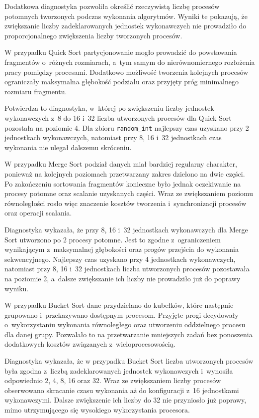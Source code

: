 Dodatkowa diagnostyka pozwoliła określić rzeczywistą liczbę procesów potomnych tworzonych podczas wykonania algorytmów. 
Wyniki te pokazują, że zwiększanie liczby zadeklarowanych jednostek wykonawczych
nie prowadziło do proporcjonalnego zwiększenia liczby tworzonych procesów.

W przypadku Quick Sort partycjonowanie mogło prowadzić do powstawania fragmentów o~różnych rozmiarach, 
a~tym samym do nierównomiernego rozłożenia pracy pomiędzy procesami. 
Dodatkowo możliwość tworzenia kolejnych procesów ograniczały maksymalna głębokość podziału oraz przyjęty próg minimalnego rozmiaru fragmentu.

Potwierdza to diagnostyka, w~której po zwiększeniu liczby jednostek wykonawczych z~8 do 16 i~32 
liczba utworzonych procesów dla Quick Sort pozostała na poziomie 4. 
Dla zbioru \texttt{random\_int} najlepszy czas uzyskano przy 2 jednostkach wykonawczych,
natomiast przy 8, 16 i~32 jednostkach czas wykonania nie ulegał dalszemu skróceniu.

W przypadku Merge Sort podział danych miał bardziej regularny charakter, ponieważ na kolejnych 
poziomach przetwarzany zakres dzielono na dwie części. 
Po zakończeniu sortowania fragmentów konieczne było jednak oczekiwanie na procesy potomne oraz scalanie uzyskanych części. 
Wraz ze zwiększaniem poziomu równoległości rosło więc znaczenie kosztów tworzenia i~synchronizacji procesów oraz operacji scalania.

Diagnostyka wykazała, że przy 8, 16 i~32 jednostkach wykonawczych dla Merge Sort utworzono po 2 procesy potomne. 
Jest to zgodne z~ograniczeniem wynikającym z~maksymalnej głębokości oraz progów przejścia do wykonania sekwencyjnego. 
Najlepszy czas uzyskano przy 4 jednostkach wykonawczych,
natomiast przy 8, 16 i~32 jednostkach liczba utworzonych procesów pozostawała na poziomie 2,
a~dalsze zwiększanie ich liczby nie prowadziło już do poprawy wyniku.

W przypadku Bucket Sort dane przydzielano do kubełków, które następnie grupowano i~przekazywano dostępnym procesom. 
Przyjęte progi decydowały o~wykorzystaniu wykonania równoległego oraz utworzeniu oddzielnego procesu dla danej grupy. 
Pozwalało to na przetwarzanie mniejszych zadań bez ponoszenia dodatkowych kosztów związanych z~wieloprocesowością.

Diagnostyka wykazała, że w przypadku Bucket Sort liczba utworzonych procesów była zgodna z~liczbą 
zadeklarowanych jednostek wykonawczych i~wynosiła odpowiednio 2, 4, 8, 16 oraz 32. 
Wraz ze zwiększaniem liczby procesów obserwowano skracanie czasu wykonania aż do konfiguracji z~16 jednostkami wykonawczymi. 
Dalsze zwiększenie ich liczby do 32 nie przyniosło już poprawy, mimo utrzymującego się wysokiego wykorzystania procesora. 

